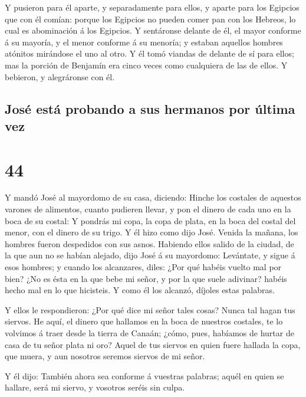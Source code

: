  Y pusieron para él aparte, y separadamente para ellos, y
aparte para los Egipcios que con él comían: porque los Egipcios no
pueden comer pan con los Hebreos, lo cual es abominación á los Egipcios.
 Y sentáronse delante de él, el mayor conforme á su
mayoría, y el menor conforme á su menoría; y estaban aquellos hombres
atónitos mirándose el uno al otro.  Y él tomó viandas de
delante de sí para ellos; mas la porción de Benjamín era cinco veces
como cualquiera de las de ellos. Y bebieron, y alegráronse con él.

\hypertarget{josuxe9-estuxe1-probando-a-sus-hermanos-por-uxfaltima-vez}{%
\subsection{José está probando a sus hermanos por última
vez}\label{josuxe9-estuxe1-probando-a-sus-hermanos-por-uxfaltima-vez}}

\hypertarget{section-43}{%
\section{44}\label{section-43}}

 Y mandó José al mayordomo de su casa, diciendo: Hinche
los costales de aquestos varones de alimentos, cuanto pudieren llevar, y
pon el dinero de cada uno en la boca de su costal:  Y
pondrás mi copa, la copa de plata, en la boca del costal del menor, con
el dinero de su trigo. Y él hizo como dijo José.  Venida
la mañana, los hombres fueron despedidos con sus asnos. 
Habiendo ellos salido de la ciudad, de la que aun no se habían alejado,
dijo José á su mayordomo: Levántate, y sigue á esos hombres; y cuando
los alcanzares, diles: ¿Por qué habéis vuelto mal por bien?
 ¿No es ésta en la que bebe mi señor, y por la que suele
adivinar? habéis hecho mal en lo que hicisteis.  Y como él
los alcanzó, díjoles estas palabras.

 Y ellos le respondieron: ¿Por qué dice mi señor tales
cosas? Nunca tal hagan tus siervos.  He aquí, el dinero
que hallamos en la boca de nuestros costales, te lo volvimos á traer
desde la tierra de Canaán; ¿cómo, pues, habíamos de hurtar de casa de tu
señor plata ni oro?  Aquel de tus siervos en quien fuere
hallada la copa, que muera, y aun nosotros seremos siervos de mi señor.

 Y él dijo: También ahora sea conforme á vuestras
palabras; aquél en quien se hallare, será mi siervo, y vosotros seréis
sin culpa.

